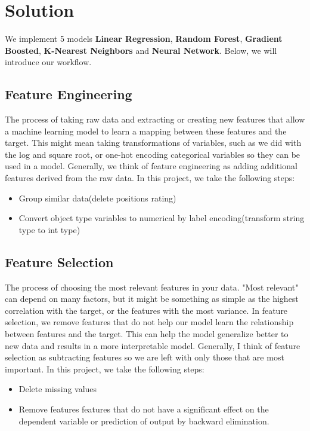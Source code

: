 \documentclass{article}
\begin{document}
\section*{Solution}
We implement 5 models \textbf{Linear Regression}, \textbf{Random Forest}, \textbf{Gradient Boosted}, \textbf{K-Nearest Neighbors} and \textbf{Neural Network}. Below, we will introduce our workflow.

\subsection*{Feature Engineering}
The process of taking raw data and extracting or creating new features that allow a machine learning model to learn a mapping between these features and the target. This might mean taking transformations of variables, such as we did with the log and square root, or one-hot encoding categorical variables so they can be used in a model. Generally, we think of feature engineering as adding additional features derived from the raw data.
In this project, we take the following steps:
\begin{itemize}
    \item Group similar data(delete positions rating)
    \item Convert object type variables to numerical by label encoding(transform string type to int type)
\end{itemize}



\subsection*{Feature Selection}
 The process of choosing the most relevant features in your data. "Most relevant" can depend on many factors, but it might be something as simple as the highest correlation with the target, or the features with the most variance. In feature selection, we remove features that do not help our model learn the relationship between features and the target. This can help the model generalize better to new data and results in a more interpretable model. Generally, I think of feature selection as subtracting features so we are left with only those that are most important.
In this project, we take the following steps:
\begin{itemize}
    \item Delete missing values
    \item Remove features features that do not have a significant effect on the dependent variable or prediction of output by backward elimination.
\end{itemize}
\end{document}
